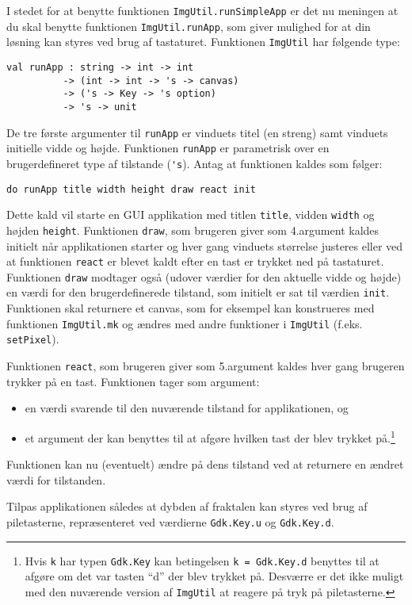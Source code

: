 \label{sierpinskikeys.ov} I stedet for at benytte
  funktionen \lstinline{ImgUtil.runSimpleApp} er det nu meningen at du skal benytte
  funktionen \lstinline{ImgUtil.runApp}, som giver mulighed for at din løsning
  kan styres ved brug af tastaturet. Funktionen \lstinline{ImgUtil}
  har følgende type:
\begin{footnotesize}
\begin{lstlisting}[numbers=none,frame=none,mathescape]
val runApp : string -> int -> int
          -> (int -> int -> 's -> canvas)
          -> ('s -> Key -> 's option)
          -> 's -> unit
\end{lstlisting}
\end{footnotesize}
De tre første argumenter til \lstinline{runApp} er vinduets titel (en
streng) samt vinduets initielle vidde og højde. Funktionen
\lstinline{runApp} er parametrisk over en brugerdefineret type af tilstande (\lstinline{'s}). Antag at funktionen kaldes som følger:
\begin{footnotesize}
\begin{lstlisting}[numbers=none,frame=none,mathescape]
do runApp title width height draw react init
\end{lstlisting}
\end{footnotesize}
Dette kald vil starte en GUI applikation med titlen \lstinline{title},
vidden \lstinline{width} og højden \lstinline{height}. Funktionen
\lstinline{draw}, som brugeren giver som 4.\@ argument kaldes initielt
når applikationen starter og hver gang vinduets størrelse justeres
eller ved at funktionen \lstinline{react} er blevet kaldt efter en
tast er trykket ned på tastaturet. Funktionen \lstinline{draw} modtager
også (udover værdier for den aktuelle vidde og højde) en værdi for den
brugerdefinerede tilstand, som initielt er sat til værdien
\lstinline{init}. Funktionen skal returnere et canvas, som for
eksempel kan konstrueres med funktionen \lstinline{ImgUtil.mk} og
ændres med andre funktioner i \lstinline{ImgUtil}
(f.eks. \lstinline{setPixel}).

Funktionen \lstinline{react}, som brugeren giver som 5.\@ argument
kaldes hver gang brugeren trykker på en tast. Funktionen tager som
argument:
\begin{itemize}
\item en værdi svarende til den nuværende tilstand for
applikationen, og
\item et argument der kan benyttes til at afgøre hvilken
tast der blev trykket på.\footnote{Hvis \lstinline{k} har typen
  \lstinline{Gdk.Key} kan betingelsen
  \lstinline{k = Gdk.Key.d} benyttes til at
  afgøre om det var tasten ``d'' der blev trykket på. Desværre er det ikke muligt med den nuværende version af \lstinline{ImgUtil} at reagere på tryk på piletasterne.}
\end{itemize}
Funktionen kan
nu (eventuelt) ændre på dens tilstand ved at returnere en ændret værdi
for tilstanden.

Tilpas applikationen således at dybden af fraktalen kan styres ved
brug af piletasterne, repræsenteret ved værdierne
\lstinline{Gdk.Key.u} og \lstinline{Gdk.Key.d}.
